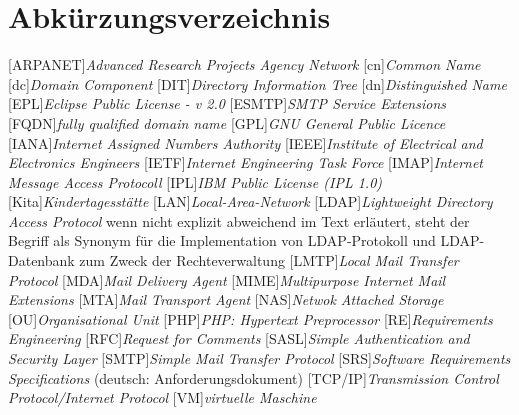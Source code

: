 
\chapter*{Abkürzungsverzeichnis}

\begin{acronym}
[ARPANET]{\textit{Advanced Research Projects Agency Network}}
[cn]{\textit{Common Name}}
[dc]{\textit{Domain Component}}
[DIT]{\textit{Directory Information Tree}}
[dn]{\textit{Distinguished Name}}
[EPL]{\textit{Eclipse Public License - v 2.0}}
[ESMTP]{\textit{SMTP Service Extensions}}
[FQDN]{\textit{fully qualified domain name}}
[GPL]{\textit{GNU General Public Licence}}
[IANA]{\textit{Internet Assigned Numbers Authority}}
[IEEE]{\textit{Institute of Electrical and Electronics Engineers}}
[IETF]{\textit{Internet Engineering Task Force}}
[IMAP]{\textit{Internet Message Access Protocoll}}
[IPL]{\textit{IBM Public License (IPL 1.0)}}
[Kita]{\textit{Kindertagesstätte}}
[LAN]{\textit{Local-Area-Network}}
[LDAP]{\textit{Lightweight Directory Access Protocol}}
wenn nicht explizit abweichend im Text erläutert, steht der Begriff als Synonym für die Implementation von LDAP-Protokoll und LDAP-Datenbank zum Zweck der Rechteverwaltung
[LMTP]{\textit{Local Mail Transfer Protocol}}
[MDA]{\textit{Mail Delivery Agent}}
[MIME]{\textit{Multipurpose Internet Mail Extensions}}
[MTA]{\textit{Mail Transport Agent}}
[NAS]{\textit{Netwok Attached Storage}}
[OU]{\textit{Organisational Unit}}
[PHP]{\textit{PHP: Hypertext Preprocessor}}
[RE]{\textit{Requirements Engineering}}
[RFC]{\textit{Request for Comments}}
[SASL]{\textit{Simple Authentication and Security Layer}}
[SMTP]{\textit{Simple Mail Transfer Protocol}}
[SRS]{\textit{Software Requirements Specifications}} 
(deutsch: Anforderungsdokument)
[TCP/IP]{\textit{Transmission Control Protocol/Internet Protocol}}
[VM]{\textit{virtuelle Maschine}}
\end{acronym}